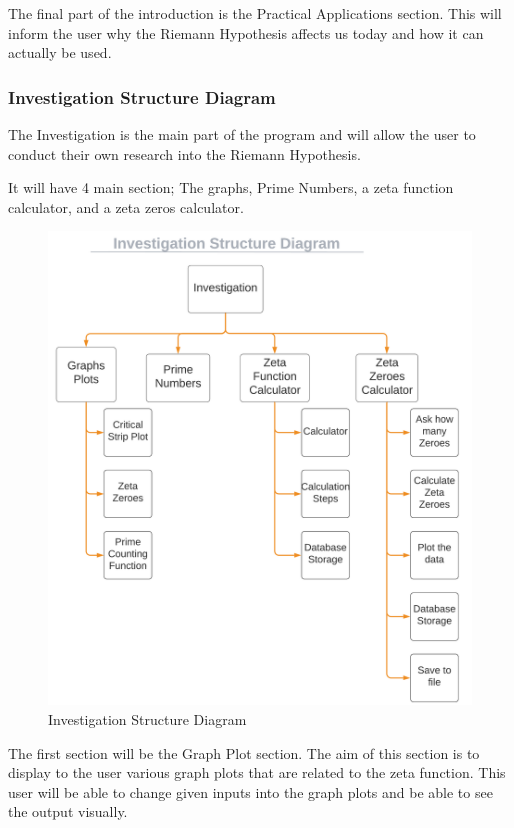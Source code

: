 \documentclass{article}
\begin{document}
The final part of the introduction is the Practical Applications section. This will inform the user why the Riemann Hypothesis affects us today and how it can actually be used.

\clearpage
\subsubsection{Investigation Structure Diagram}
The Investigation is the main part of the program and will allow the user to conduct their own research into the Riemann Hypothesis.

It will have 4 main section; The graphs, Prime Numbers, a zeta function calculator, and a zeta zeros calculator.

\begin{figure}[h]
    \centering
    \captionsetup{justification=centering}
    \includegraphics[scale=0.5]{investigation-structure-diagram}
    \caption{Investigation Structure Diagram}
\end{figure}

The first section will be the Graph Plot section. The aim of this section is to display to the user various graph plots that are related to the zeta function. This user will be able to change given inputs into the graph plots and be able to see the output visually.
\end{document}
